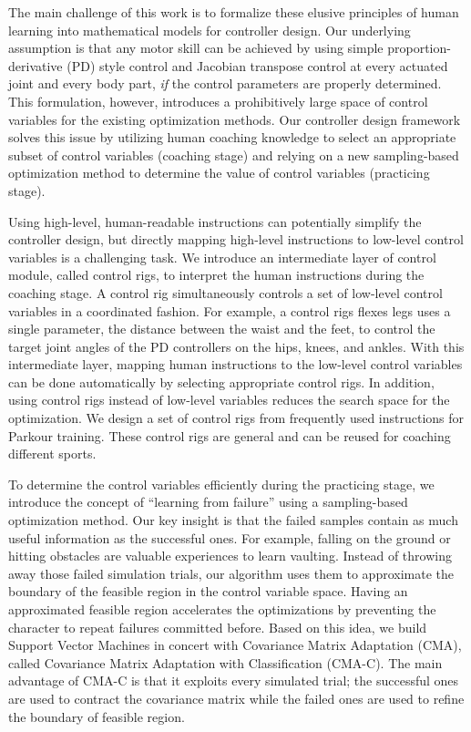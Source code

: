 The main challenge of this work is to formalize these elusive
principles of human learning into mathematical models for controller
design. Our underlying assumption is that any motor skill can be
achieved by using simple proportion-derivative (PD) style control and
Jacobian transpose control at every actuated joint and every body
part, \emph{if} the control parameters are properly determined. This
formulation, however, introduces a prohibitively large space of
control variables for the existing optimization methods. Our controller
design framework solves this issue by utilizing human coaching
knowledge to select an appropriate subset of control variables
(coaching stage) and relying on a new sampling-based optimization
method to determine the value of control variables (practicing stage).

Using high-level, human-readable instructions can potentially simplify
the controller design, but directly mapping high-level instructions to
low-level control variables is a challenging task. We introduce an
intermediate layer of control module, called control rigs, to
interpret the human instructions during the coaching stage. A control
rig simultaneously controls a set of low-level control variables in a
coordinated fashion. For example, a control rigs flexes legs
uses a single parameter, the distance between the waist and the feet,
to control the target joint angles of the PD controllers on the hips,
knees, and ankles. With this intermediate layer, mapping human
instructions to the low-level control variables can be done
automatically by selecting appropriate control rigs. In addition,
using control rigs instead of low-level variables reduces the search
space for the optimization. We design a set of control rigs from
frequently used instructions for Parkour training. These control rigs
are general and can be reused for coaching different sports.

To determine the control variables efficiently during the practicing
stage, we introduce the concept of ``learning from failure'' using a
sampling-based optimization method. Our key insight is that the failed
samples contain as much useful information as the successful ones. For
example, falling on the ground or hitting obstacles are valuable
experiences to learn vaulting. Instead of throwing away those failed
simulation trials, our algorithm uses them to approximate the boundary
of the feasible region in the control variable space. Having an
approximated feasible region accelerates the optimizations by
preventing the character to repeat failures committed before. Based on
this idea, we build Support Vector Machines in concert with Covariance
Matrix Adaptation (CMA), called Covariance Matrix Adaptation with
Classification (CMA-C). The main advantage of CMA-C is that it
exploits every simulated trial; the successful ones are used to
contract the covariance matrix while the failed ones are used to refine
the boundary of feasible region.

